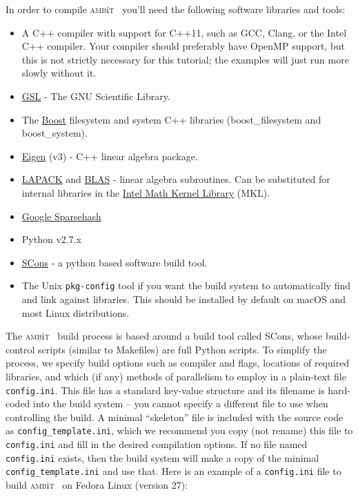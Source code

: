 \documentclass{report}
\newcommand{\ambit}{\textsc{amb}{\footnotesize i}\textsc{t}}
\begin{document}
In order to compile \ambit~ you'll need the following software libraries and tools:
\begin{itemize}
\item A C++ compiler with support for C++11, such as GCC, Clang, or the Intel C++ compiler. Your 
compiler should preferably have OpenMP support, but this is not strictly necessary for this tutorial;
the examples will just run more slowly without it.
\item \href{https://www.gnu.org/software/gsl/}{GSL} - The GNU Scientific Library. 
\item The \href{https://www.boost.org/}{Boost} filesystem and system C++ libraries (boost\_filesystem 
and boost\_system).
\item \href{http://eigen.tuxfamily.org/index.php?title=Main_Page}{Eigen} (v3) - C++ linear algebra 
package.
\item \href{http://www.netlib.org/lapack/}{LAPACK} and \href{http://www.netlib.org/blas/}{BLAS} - 
linear algebra subroutines. Can be substituted for internal libraries in the 
\href{https://software.intel.com/en-us/mkl}{Intel Math Kernel Library} (MKL).
\item \href{https://github.com/sparsehash/sparsehash}{Google Sparsehash}
\item Python v2.7.x
\item \href{http://scons.org/}{SCons} - a python based software build tool.
\item The Unix \texttt{pkg-config} tool if you want the build system to automatically find and link
against libraries. This should be installed by default on macOS and most Linux distributions.
\end{itemize}

The \ambit~ build process is based around a build tool called SCons, whose build-control scripts 
(similar to Makefiles) are full Python scripts. To simplify the process, we specify build options such 
as compiler and flags, locations of required libraries, and which (if any) methods of parallelism to 
employ in a plain-text file \texttt{config.ini}. This file has a standard key-value structure and its 
filename is hard-coded into the build system -- you cannot specify a different file to use when 
controlling the build. A minimal ``skeleton'' file is included with the source code as 
\texttt{config\_template.ini}, which we recommend you copy (not rename) this file to \texttt{config.ini}
and fill in the desired compilation options. If no file named \texttt{config.ini} exists, then the build
system will make a copy of the minimal \texttt{config\_template.ini} and use that. Here is an example of
a \texttt{config.ini} file to build \ambit~ on Fedora Linux (version 27):
\end{document}
